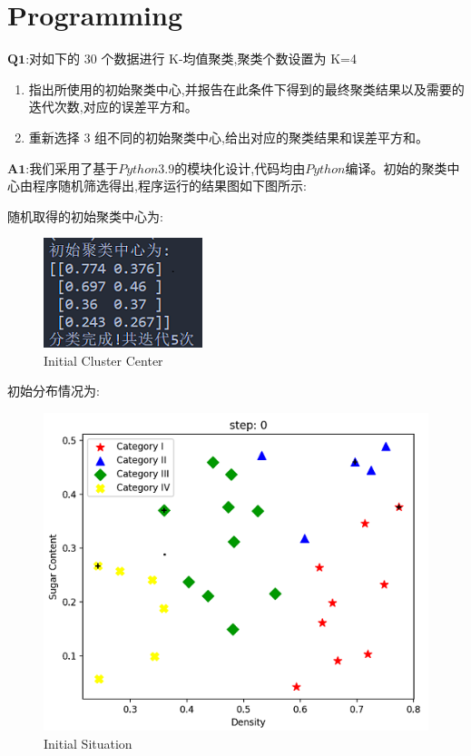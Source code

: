 \documentclass[homework]{IEEEtran}
\begin{document}
\section{Programming}
\begin{CJK}{UTF8}{gkai}

$\mathbf{Q1}$:对如下的 30 个数据进行 K-均值聚类,聚类个数设置为 K=4 \par
\begin{enumerate}
	\item 指出所使用的初始聚类中心,并报告在此条件下得到的最终聚类结果以及需要的迭代次数,对应的误差平方和。
	\item 重新选择 3 组不同的初始聚类中心,给出对应的聚类结果和误差平方和。
\end{enumerate}\par

$\mathbf{A1}$:我们采用了基于$Python3.9$的模块化设计,代码均由$Python$编译。初始的聚类中心由程序随机筛选得出,程序运行的结果图如下图所示: \par
随机取得的初始聚类中心为:
\begin{figure}[htb]
    \centerline{\includegraphics{Images/fig5.png}}
    \caption{Initial Cluster Center}
    \label{fig5}
    \end{figure} \par

初始分布情况为: \par
\begin{figure}[htb]
    \centerline{\includegraphics{Images/fig6.png}}
    \caption{Initial Situation}
    \label{fig6}
    \end{figure} 


\end{CJK}
\end{document}

